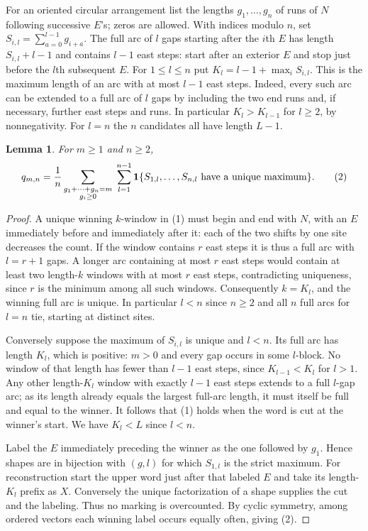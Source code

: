 \documentclass[11pt,a4paper]{article}
\numberwithin{equation}{section}
\newtheorem{lemma}[theorem]{Lemma}
\theoremstyle{definition}
\theoremstyle{remark}
\begin{document}
For an oriented circular arrangement list the lengths $g_1,\ldots,g_n$
of runs of $N$ following successive $E$'s; zeros are allowed.
With indices modulo $n$, set $S_{i,l}=\sum_{a=0}^{l-1} g_{i+a}$.
The full arc of $l$ gaps starting after the $i$th $E$ has length
$S_{i,l}+l-1$ and contains $l-1$ east steps: start after an exterior
$E$ and stop just before the $l$th subsequent $E$.
For $1\le l\le n$ put $K_l=l-1+\max_i S_{i,l}$. This is the maximum
length of an arc with at most $l-1$ east steps. Indeed, every such arc
can be extended to a full arc of $l$ gaps by including the two end runs
and, if necessary, further east steps and runs.
In particular $K_l>K_{l-1}$ for $l\ge2$, by nonnegativity.
For $l=n$ the $n$ candidates all have length $L-1$.
\begin{lemma}
For $m\ge1$ and $n\ge2$,
\[
 q_{m,n}=\frac1n
 \sum_{\substack{g_1+\cdots+g_n=m\\ g_i\ge0}}
 \;\sum_{l=1}^{n-1}
 {\bf1}\{S_{1,l},\ldots,S_{n,l}\hbox{ have a unique maximum}\}.
 \tag{2}
\]
\end{lemma}
\begin{proof}
A unique winning $k$-window in (1) must begin and end with $N$,
with an $E$ immediately before and immediately after it: each of the
two shifts by one site decreases the count. If the window contains
$r$ east steps it is thus a full arc with $l=r+1$ gaps. A longer
arc containing at most $r$ east steps would contain at least two
length-$k$ windows with at most $r$ east steps, contradicting
uniqueness, since $r$ is the minimum among all such windows.
Consequently $k=K_l$, and the winning full arc is unique.
In particular $l<n$ since $n\ge2$ and all $n$ full arcs for $l=n$
tie, starting at distinct sites.

Conversely suppose the maximum of $S_{i,l}$ is unique and $l<n$.
Its full arc has length $K_l$, which is positive: $m>0$ and
every gap occurs in some $l$-block. No window of that length has
fewer than $l-1$ east steps, since $K_{l-1}<K_l$ for $l>1$.
Any other length-$K_l$ window with exactly $l-1$ east steps extends
to a full $l$-gap arc; as its length already equals the largest
full-arc length, it must itself be full and equal to the winner.
It follows that (1) holds when the word is cut at the winner's
start. We have $K_l<L$ since $l<n$.

Label the $E$ immediately preceding the winner as the one followed by
$g_1$. Hence shapes are in bijection with $(g,l)$ for which
$S_{1,l}$ is the strict maximum. For reconstruction start the upper
word just after that labeled $E$ and take its length-$K_l$ prefix as
$X$. Conversely the unique factorization of a shape supplies the cut
and the labeling. Thus no marking is overcounted. By cyclic symmetry,
among ordered vectors each winning label occurs equally often,
giving (2).
\end{proof}
\end{document}
